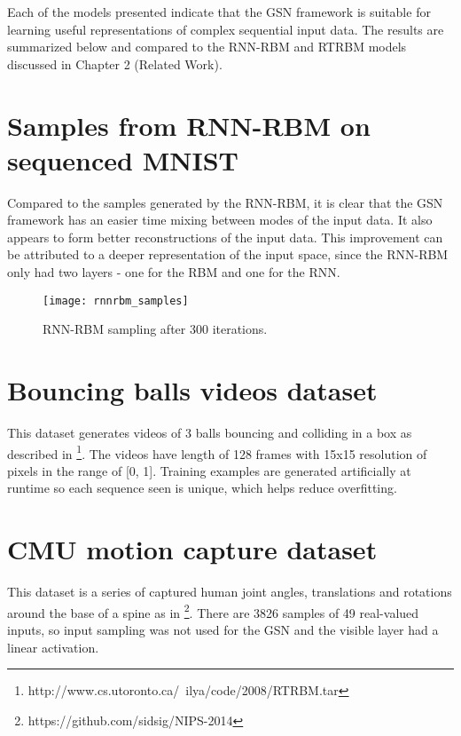 Each of the models presented indicate that the GSN framework is suitable for learning useful representations of complex sequential input data. The results are summarized below and compared to the RNN-RBM and RTRBM models discussed in Chapter 2 (Related Work).

\section{Samples from RNN-RBM on sequenced MNIST}

Compared to the samples generated by the RNN-RBM, it is clear that the GSN framework has an easier time mixing between modes of the input data. It also appears to form better reconstructions of the input data. This improvement can be attributed to a deeper representation of the input space, since the RNN-RBM only had two layers - one for the RBM and one for the RNN.

\begin{figure}[h!]
  \centering
    \texttt{[image: rnnrbm\_samples]}
\caption{RNN-RBM sampling after 300 iterations.}
\end{figure}

\section{Bouncing balls videos dataset}

This dataset generates videos of 3 balls bouncing and colliding in a box as described in \cite{lewandowski12}\footnote{http://www.cs.utoronto.ca/~ilya/code/2008/RTRBM.tar}. The videos have length of 128 frames with 15x15 resolution of pixels in the range of [0, 1]. Training examples are generated artificially at runtime so each sequence seen is unique, which helps reduce overfitting.

\section{CMU motion capture dataset}

This dataset is a series of captured human joint angles, translations and rotations around the base of a spine as in \cite{sutskever08}\footnote{https://github.com/sidsig/NIPS-2014}. There are 3826 samples of 49 real-valued inputs, so input sampling was not used for the GSN and the visible layer had a linear activation.

